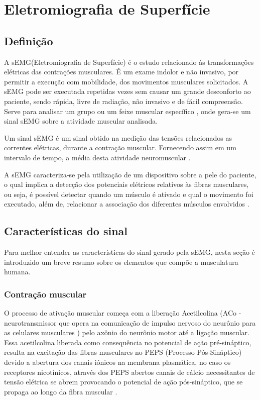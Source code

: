 \chapter{Eletromiografia de Superfície}
\label{ch:sEMG}
\section{Definição}
A sEMG(Eletromiografia de Superfície) é o estudo relacionado às transformações elétricas das contrações musculares. É um exame indolor e não invasivo, por permitir a execução com mobilidade, dos movimentos musculares solicitados. A sEMG pode ser executada repetidas vezes sem causar um grande desconforto ao paciente, sendo rápida, livre de radiação, não invasivo e de fácil compreensão. Serve para analisar um grupo ou um feixe muscular específico \cite{de2010eletromiografia}, onde gera-se um sinal sEMG sobre a atividade muscular analisada.

Um sinal sEMG é um sinal obtido na medição das tensões relacionados as correntes elétricas, durante a contração muscular. Fornecendo assim em um intervalo de tempo, a média desta atividade neuromuscular \cite{reaz2006techniques}.

A sEMG caracteriza-se pela utilização de um dispositivo sobre a pele do paciente, o qual implica a detecção dos potenciais elétricos relativos às fibras musculares, ou seja, é possível detectar quando um músculo é ativado e qual o movimento foi executado, além de, relacionar a associação dos diferentes músculos envolvidos \cite{botelho2010avaliaccao}.

\section{Características do sinal}
Para melhor entender as características do sinal gerado pela sEMG, nesta seção é introduzido um breve resumo sobre os elementos que compõe a musculatura humana.

\subsection{Contração muscular}
O processo de ativação muscular começa com a liberação Acetilcolina (ACo - neurotransmissor que opera na comunicação de impulso nervoso do neurônio para as celulares musculares \cite{flores2005estructura}) pelo axônio do neurônio motor até a ligação muscular. Essa acetilcolina liberada como consequência no potencial de ação pré-sináptico, resulta na excitação das fibras musculares no PEPS (Processo Pós-Sináptico) devido a abertura dos canais iónicos na membrana plasmática, no caso os receptores nicotínicos, através dos PEPS abertos canais de cálcio necessitantes de tensão elétrica se abrem provocando o potencial de ação pós-sináptico, que se propaga ao longo da fibra muscular \cite{da2005detecccao}.


